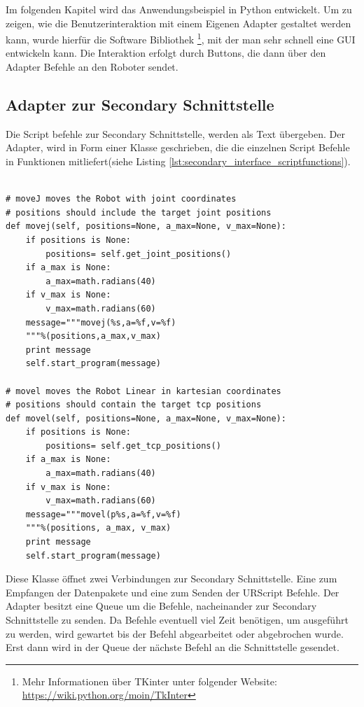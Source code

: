 Im folgenden Kapitel wird das Anwendungsbeispiel in Python entwickelt. Um zu zeigen, wie die Benutzerinteraktion mit einem Eigenen Adapter gestaltet werden kann, wurde hierfür die Software Bibliothek \footnote{Mehr Informationen über TKinter unter folgender Website: \url{https://wiki.python.org/moin/TkInter}}, mit der man sehr schnell eine \ac{GUI} entwickeln kann. Die Interaktion erfolgt durch Buttons, die dann über den Adapter Befehle an den Roboter sendet.

\subsection{Adapter zur Secondary Schnittstelle}
\label{beschreibung_script_hoeher_schicht}

Die Script befehle zur Secondary Schnittstelle, werden als Text übergeben. Der Adapter, wird in Form einer Klasse geschrieben, die die einzelnen Script Befehle in Funktionen mitliefert(siehe Listing \ref{lst:secondary_interface_scriptfunctions}).

\begin{lstlisting}[caption={Ausschnitt zeigt Funktionen, die Scriptbefehle in der Adapter Klasse umgesetzten}, label=lst:urscipt_program_lst ,captionpos=b]

# moveJ moves the Robot with joint coordinates
# positions should include the target joint positions
def movej(self, positions=None, a_max=None, v_max=None):
    if positions is None:
        positions= self.get_joint_positions()
    if a_max is None:
        a_max=math.radians(40)
    if v_max is None:
        v_max=math.radians(60)
    message="""movej(%s,a=%f,v=%f)
    """%(positions,a_max,v_max)
    print message
    self.start_program(message)

# movel moves the Robot Linear in kartesian coordinates
# positions should contain the target tcp positions
def movel(self, positions=None, a_max=None, v_max=None):
    if positions is None:
        positions= self.get_tcp_positions()
    if a_max is None:
        a_max=math.radians(40)
    if v_max is None:
        v_max=math.radians(60)
    message="""movel(p%s,a=%f,v=%f)
    """%(positions, a_max, v_max)
    print message
    self.start_program(message)
\end{lstlisting}

Diese Klasse öffnet zwei Verbindungen zur Secondary Schnittstelle. Eine zum Empfangen der Datenpakete und eine zum Senden der URScript Befehle. Der Adapter besitzt eine \ac{Queue} um die Befehle, nacheinander zur Secondary Schnittstelle zu senden. Da Befehle eventuell viel Zeit benötigen, um ausgeführt zu werden, wird gewartet bis der Befehl abgearbeitet oder abgebrochen wurde. Erst dann wird in der Queue der nächste Befehl an die Schnittstelle gesendet.

